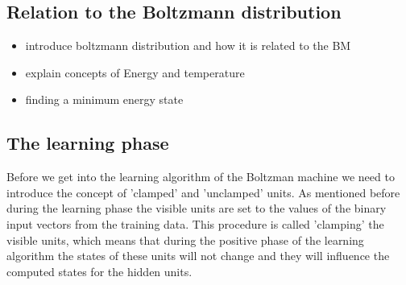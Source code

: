 \documentclass[12pt,twoside]{article}
\theoremstyle{plain}
\theoremstyle{definition}
\theoremstyle{remark}
\begin{document}
\subsection{Relation to the Boltzmann distribution}
\begin{itemize}
        \item introduce boltzmann distribution and how it is related to the BM
        \item explain concepts of Energy and temperature
        \item finding a minimum energy state
\end{itemize}

\subsection{The learning phase}
Before we get into the learning algorithm of the Boltzman machine we need to introduce the concept of 'clamped' and 'unclamped' units.
As mentioned before during the learning phase the visible units are set to the values of the binary input vectors from the training data.
This procedure is called 'clamping' the visible units, which means that during the positive phase of the learning
algorithm the states of these units will not change and they will influence the computed states for the hidden units.
\end{document}
